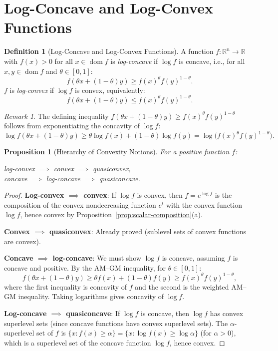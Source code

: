 \documentclass[11pt,a4paper]{article}
\newtheorem{proposition}[theorem]{Proposition}
\theoremstyle{definition}
\newtheorem{definition}[theorem]{Definition}
\theoremstyle{remark}
\newtheorem{remark}[theorem]{Remark}
\newcommand{\R}{\mathbb{R}}
\DeclareMathOperator{\dom}{dom}
\begin{document}
\section{Log-Concave and Log-Convex Functions}

\begin{definition}[Log-Concave and Log-Convex Functions]
\label{def:log-concave}
A function $f : \R^n \to \R$ with $f(x) > 0$ for all $x \in \dom f$ is
\emph{log-concave} if $\log f$ is concave, i.e., for all $x, y \in \dom f$ and
$\theta \in [0,1]$:
\[
  f(\theta x + (1-\theta) y) \ge f(x)^\theta f(y)^{1-\theta}.
\]
$f$ is \emph{log-convex} if $\log f$ is convex, equivalently:
\[
  f(\theta x + (1-\theta) y) \le f(x)^\theta f(y)^{1-\theta}.
\]
\end{definition}

\begin{remark}
The defining inequality $f(\theta x + (1-\theta) y) \ge f(x)^\theta f(y)^{1-\theta}$
follows from exponentiating the concavity of $\log f$:
\[
  \log f(\theta x + (1-\theta) y) \ge \theta \log f(x) + (1-\theta) \log f(y)
  = \log\bigl(f(x)^\theta f(y)^{1-\theta}\bigr).
\]
\end{remark}

\begin{proposition}[Hierarchy of Convexity Notions]
\label{prop:hierarchy}
For a positive function $f$:
\begin{center}
  log-convex $\implies$ convex $\implies$ quasiconvex, \\[4pt]
  concave $\implies$ log-concave $\implies$ quasiconcave.
\end{center}
\end{proposition}

\begin{proof}
\textbf{Log-convex $\implies$ convex}: If $\log f$ is convex, then $f = e^{\log f}$ is
the composition of the convex nondecreasing function $e^t$ with the convex function
$\log f$, hence convex by Proposition~\ref{prop:scalar-composition}(a).

\textbf{Convex $\implies$ quasiconvex}: Already proved (sublevel sets of convex
functions are convex).

\textbf{Concave $\implies$ log-concave}: We must show $\log f$ is concave, assuming $f$ is
concave and positive. By the AM--GM inequality, for $\theta \in [0,1]$:
\[
  f(\theta x + (1-\theta) y) \ge \theta f(x) + (1-\theta) f(y)
  \ge f(x)^\theta f(y)^{1-\theta},
\]
where the first inequality is concavity of $f$ and the second is the weighted AM--GM
inequality. Taking logarithms gives concavity of $\log f$.

\textbf{Log-concave $\implies$ quasiconcave}: If $\log f$ is concave, then $\log f$
has convex superlevel sets (since concave functions have convex superlevel sets).
The $\alpha$-superlevel set of $f$ is $\{x : f(x) \ge \alpha\} = \{x : \log f(x) \ge
\log \alpha\}$ (for $\alpha > 0$), which is a superlevel set of the concave function
$\log f$, hence convex.
\end{proof}
\end{document}
